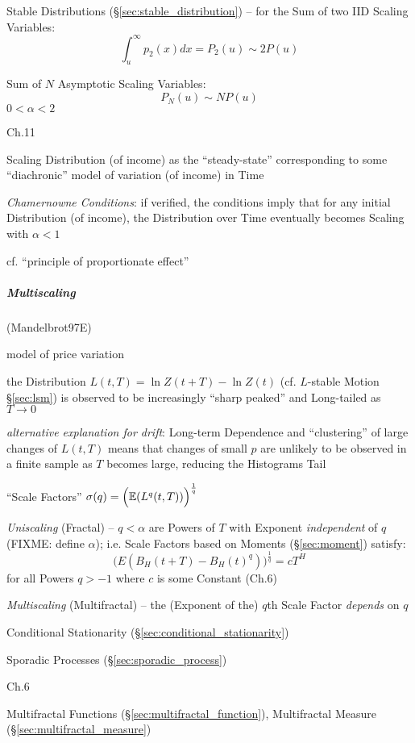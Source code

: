 Stable Distributions (\S\ref{sec:stable_distribution}) -- for the Sum of two
IID Scaling Variables:
\[
  \int_u^\infty p_2(x) dx = P_2(u) \sim 2 P(u)
\]

Sum of $N$ Asymptotic Scaling Variables:
\[
  P_N(u) \sim N P(u)
\]
$0 < \alpha < 2$

Ch.11

Scaling Distribution (of income) as the ``steady-state'' corresponding to some
``diachronic'' model of variation (of income) in Time

\emph{Chamernowne Conditions}: if verified, the conditions imply that for any
initial Distribution (of income), the Distribution over Time eventually becomes
Scaling with $\alpha < 1$

cf. ``principle of proportionate effect''



\subparagraph{Multiscaling}\label{sec:multiscaling}\hfill

(Mandelbrot97E)

model of price variation

the Distribution $L(t, T) = \ln Z(t + T) - \ln Z(t)$ (cf. $L$-stable Motion
\S\ref{sec:lsm}) is observed to be increasingly ``sharp peaked'' and Long-tailed
as $T \to 0$

\emph{alternative explanation for drift}: Long-term Dependence and
``clustering'' of large changes of $L(t, T)$ means that changes of small $p$ are
unlikely to be observed in a finite sample as $T$ becomes large, reducing the
Histograms Tail

``Scale Factors'' $\sigma(q) = \Big(\mathbb{E}(L^q(t, T))\Big)^{\frac{1}{q}}$

\emph{Uniscaling} (Fractal) -- $q < \alpha$ are Powers of $T$ with Exponent
\emph{independent} of $q$ (FIXME: define $\alpha$); i.e. Scale Factors based on
Moments (\S\ref{sec:moment}) satisfy:
\[
  \Big(E(B_H(t + T) - B_H(t)^q)\Big)^{\frac{1}{q}} = c T^H
\]
for all Powers $q > -1$ where $c$ is some Constant (Ch.6)

\emph{Multiscaling} (Multifractal) -- the (Exponent of the) $q$th Scale Factor
\emph{depends} on $q$

\fist Conditional Stationarity (\S\ref{sec:conditional_stationarity})

\fist Sporadic Processes (\S\ref{sec:sporadic_process})

Ch.6

Multifractal Functions (\S\ref{sec:multifractal_function}), Multifractal Measure
(\S\ref{sec:multifractal_measure})

